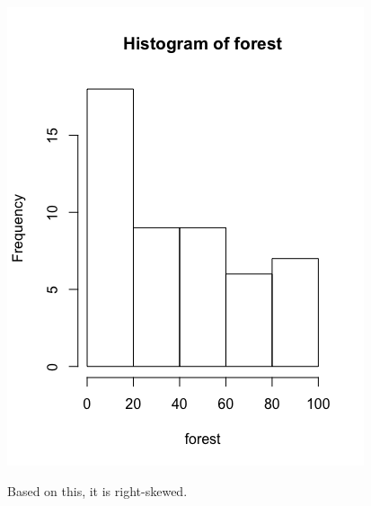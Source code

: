 \documentclass[11pt]{article}
\begin{document}
		\begin{center}
			\includegraphics[scale=0.5]{images/foresthist.png}
		\end{center}\par
		Based on this, it is right-skewed.\par
		
\end{document}
